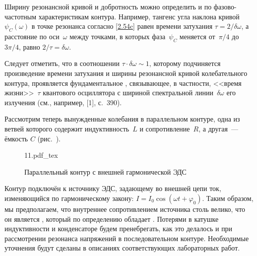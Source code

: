 \documentclass[a4paper,oneside]{book}
\begin{document}
Ширину резонансной кривой и добротность можно определить и по
фазово-частотным характеристикам контура. Например, тангенс угла наклона
кривой $\psi_C(\omega)$ в точке резонанса согласно \eqref{2.54c} равен времени
затухания $\tau=2/\delta\omega$, а расстояние по оси~$\omega$ между точками, в
которых фаза~$\psi_C$ меняется от~$\pi/4$ до~$3\pi/4$, равно
$2/\tau=\delta\omega$.

Следует отметить, что в соотношении $\tau\cdot\delta\omega\sim1$, которому
подчиняется произведение времени затухания и ширины резонансной кривой
колебательного контура, проявляется фундаментальное , связывающее, в частности, <<время жизни>>~$\tau$ квантового
осциллятора с шириной спектральной линии~$\delta\omega$ его излучения (см.,
например, [1], с.~390).


Рассмотрим теперь вынужденные колебания в параллельном контуре, одна из ветвей
которого содержит индуктивность~$L$ и сопротивление~$R$, а другая~--- ёмкость
$C$ (рис.~).
\begin{center}
	\begin{figure}[h!]
		\centering
		{11.pdf_tex}
		\caption{Параллельный контур с внешней гармонической ЭДС}
	\end{figure}
\end{center}

Контур подключён к источнику ЭДС, задающему во внешней цепи ток, изменяющийся по
гармоническому закону: $I=I_0\cos(\omega t+\varphi_0)$. Таким образом, мы
предполагаем, что внутреннее сопротивлением источника столь велико, что он
является , который по определению обладает
. Потерями в катушке
индуктивности и конденсаторе будем пренебрегать, как это делалось и при
рассмотрении резонанса напряжений в последовательном контуре. Необходимые
уточнения будут сделаны в описаниях соответствующих лабораторных работ.
\end{document}
